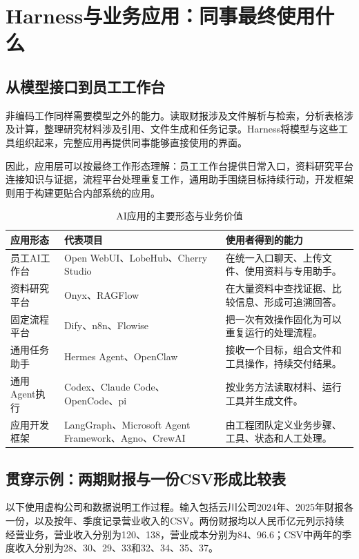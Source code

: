 \section{Harness与业务应用：同事最终使用什么}

\subsection{从模型接口到员工工作台}
非编码工作同样需要模型之外的能力。读取财报涉及文件解析与检索，分析表格涉及计算，整理研究材料涉及引用、文件生成和任务记录。Harness将模型与这些工具组织起来，完整应用再提供同事能够直接使用的界面。

因此，应用层可以按最终工作形态理解：员工工作台提供日常入口，资料研究平台连接知识与证据，流程平台处理重复工作，通用助手围绕目标持续行动，开发框架则用于构建更贴合内部系统的应用。

\begin{table}[H]\small\centering
\caption{AI应用的主要形态与业务价值}\label{tab:application-types}
\begin{tabularx}{\linewidth}{@{}P{28mm}Y Y@{}}\toprule
应用形态 & 代表项目 & 使用者得到的能力\\\midrule
员工AI工作台 & Open WebUI、LobeHub、Cherry Studio & 在统一入口聊天、上传文件、使用资料与专用助手。\\
资料研究平台 & Onyx、RAGFlow & 在大量资料中查找证据、比较信息、形成可追溯回答。\\
固定流程平台 & Dify、n8n、Flowise & 把一次有效操作固化为可以重复运行的处理流程。\\
通用任务助手 & Hermes Agent、OpenClaw & 接收一个目标，组合文件和工具操作，持续交付结果。\\
通用Agent执行 & Codex、Claude Code、OpenCode、pi & 按业务方法读取材料、运行工具并生成文件。\\
应用开发框架 & LangGraph、Microsoft Agent Framework、Agno、CrewAI & 由工程团队定义业务步骤、工具、状态和人工处理。\\\bottomrule
\end{tabularx}
\end{table}

\subsection{贯穿示例：两期财报与一份CSV形成比较表}\label{sec:case}
以下使用虚构公司和数据说明工作过程。输入包括云川公司2024年、2025年财报各一份，以及按年、季度记录营业收入的CSV。两份财报均以人民币亿元列示持续经营业务，营业收入分别为120、138，营业成本分别为84、96.6；CSV中两年的季度收入分别为28、30、29、33和32、34、35、37。


